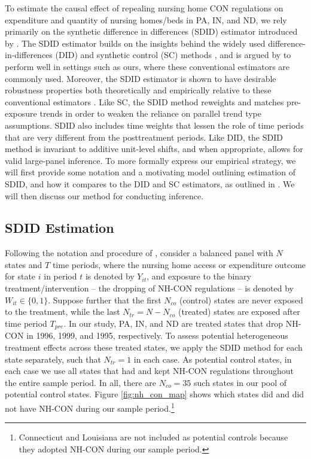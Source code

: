 \documentclass[../Main.tex]{subfiles}
\begin{document}
To estimate the causal effect of repealing nursing home CON regulations on expenditure and quantity of nursing homes/beds in PA, IN, and ND, we rely primarily on the synthetic difference in differences (SDID) estimator introduced by \citet{arkhangelsky2021synthetic}. The SDID estimator builds on the insights behind the widely used difference-in-differences (DID) and synthetic control (SC) methods \citep{abadie2003economic,abadie2010synthetic,currie2020technology}, and is argued by \citet{arkhangelsky2021synthetic} to perform well in settings such as ours, where these conventional estimators are commonly used. Moreover, the SDID estimator is shown to have desirable robustness properties both theoretically and empirically relative to these conventional estimators \citep{arkhangelsky2021synthetic}. Like SC, the SDID method reweights and matches pre-exposure trends in order to weaken the reliance on parallel trend type assumptions. SDID also includes time weights that lessen the role of time periods that are very different from the posttreatment periods. Like DID, the SDID method is invariant to additive unit-level shifts, and when appropriate, allows for valid large-panel inference. To more formally express our empirical strategy, we will first provide some notation and a motivating model outlining estimation of SDID, and how it compares to the DID and SC estimators, as outlined in \citet{arkhangelsky2021synthetic}. We will then discuss our method for conducting inference.

\subsection{SDID Estimation} \label{sdid_estimation}

Following the notation and procedure of \citet{arkhangelsky2021synthetic}, consider a balanced panel with $N$ states and $T$ time periods, where the nursing home access or expenditure outcome for state $i$ in period $t$ is denoted by $Y_{it}$, and exposure to the binary treatment/intervention -- the dropping of NH-CON regulations -- is denoted by $W_{it} \in \{0,1\}$. Suppose further that the first $N_{co}$ (control) states are never exposed to the treatment, while the last $N_{tr}=N-N_{co}$ (treated) states are exposed after time period $T_{pre}$. In our study, PA, IN, and ND are treated states that drop NH-CON in 1996, 1999, and 1995, respectively. To assess potential heterogeneous treatment effects across these treated states, we apply the SDID method for each state separately, such that $N_{tr}=1$ in each case. As potential control states, in each case we use all states that had and kept NH-CON regulations throughout the entire sample period. In all, there are $N_{co}=35$ such states in our pool of potential control states. Figure \ref{fig:nh_con_map} shows which states did and did not have NH-CON during our sample period.\footnote{Connecticut and Louisiana are not included as potential controls because they adopted NH-CON during our sample period.}
\end{document}

